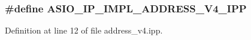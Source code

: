 \subsubsection[{A\+S\+I\+O\+\_\+\+I\+P\+\_\+\+I\+M\+P\+L\+\_\+\+A\+D\+D\+R\+E\+S\+S\+\_\+\+V4\+\_\+\+I\+P\+P}]{\setlength{\rightskip}{0pt plus 5cm}\#define A\+S\+I\+O\+\_\+\+I\+P\+\_\+\+I\+M\+P\+L\+\_\+\+A\+D\+D\+R\+E\+S\+S\+\_\+\+V4\+\_\+\+I\+P\+P}\label{address__v4_8ipp_ae53552b5112fb7041c7a788d09fbd23f}


Definition at line 12 of file address\+\_\+v4.\+ipp.

